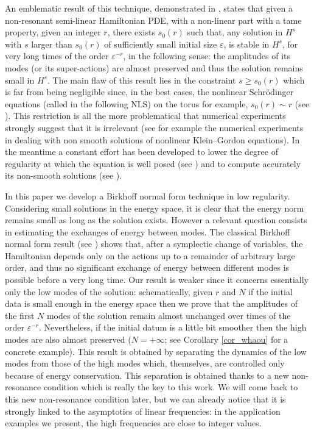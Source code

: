 \documentclass[JEP,XML,SOM,Unicode,NoEqCountersInSection,published]{cedram}
\theoremstyle{definition}
\begin{document}
An emblematic result of this technique, demonstrated in \cite{BG06}, states that given a non-resonant semi-linear Hamiltonian PDE, with a non-linear part with a tame property, given an integer $r$, there exists $s_0(r)$ such that, any solution in $H^s$ with $s$ larger than $s_0(r)$ of sufficiently small initial size $\varepsilon$, is stable in $H^s$, for very long times of the order $\varepsilon^{-r}$, in the following sense: the amplitudes of its modes (or its super-actions) are almost preserved and thus the solution remains small in $H^s$. The main flaw of this result lies in the constraint $s\geq s_0(r)$ which is far from being negligible since, in the best cases, the nonlinear Schrödinger equations (called in the following NLS) on the torus for example, $s_0(r)\sim r$ (see \cite{BMP20}). This restriction is all the more problematical that numerical experiments strongly suggest that it is irrelevant (see for example the numerical experiments in \cite{CHL08a,CHL08b} dealing with non smooth solutions of nonlinear Klein--Gordon equations). In the meantime a constant effort has been developed to lower the degree of regularity at which the equation is well posed (see \eg \cite{Vla84,Bou93,Bou99,Caz03,BGT05}) and to compute accurately its non-smooth solutions (see \eg \cite{HS17,ORS20}).

In this paper we develop a Birkhoff normal form technique in low regularity. Considering small solutions in the energy space, it is clear that the energy norm remains small as long as the solution exists. However a relevant question consists in estimating the exchanges of energy between modes. The classical Birkhoff normal form result (see \cite{Nek77,G}) shows that, after a symplectic change of variables, the Hamiltonian depends only on the actions up to a remainder of arbitrary large order, and thus no significant exchange of energy between different modes is possible before a very long time. Our result is weaker since
it concerns essentially only the low modes of the solution: schematically, given $r$ and $N$ if the initial data is small enough in the energy space then we prove that the amplitudes of the first $N$ modes of the solution remain almost unchanged over times of the order $\varepsilon^{-r}$. Nevertheless, if the initial datum is a little bit smoother then the high modes are also almost preserved (\ie $N=+\infty$; see Corollary \ref{cor_whaou} for a concrete example). This result is obtained by separating the dynamics of the low modes from those of the high modes which, themselves, are controlled only because of energy conservation. This separation is obtained thanks to a new non-resonance condition which is really the key to this work. We will come back to this new non-resonance condition later, but we can already notice that it is strongly linked to the asymptotics of linear frequencies: in the application examples we present, the high frequencies are close to integer values.
\end{document}
